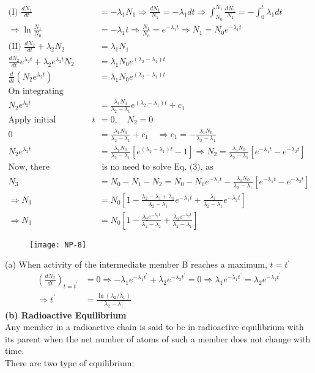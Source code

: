 \begin{align*}
\text{(I) }\frac{d N_1}{d t}&=-\lambda_1 N_1 \Rightarrow \frac{d N_1}{N_1}=-\lambda_1 d t \Rightarrow \int_{N_0}^{N_1} \frac{d N_1}{N_1}=-\int_0^t \lambda_1 d t\\
\Rightarrow \ln \frac{N_1}{N_0}&=-\lambda_1 t \Rightarrow \frac{N_1}{N_0}=e^{-\lambda_1 t} \Rightarrow N_1=N_0 e^{-\lambda_1 t}
\\
\text{(II) }\frac{d N_2}{d t}+\lambda_2 N_2&=\lambda_1 N_1\\
\frac{d N_2}{d t} e^{\lambda_2 t}+\lambda_2 e^{\lambda_2 t} N_2&=\lambda_1 N_0 e^{\left(\lambda_2-\lambda_1\right) t} \\
\frac{d}{d t}\left(N_2 e^{\lambda_2 t}\right)&=\lambda_1 N_0 e^{\left(\lambda_2-\lambda_1\right) t}\\
\text{On integrating}&\\
N_2 e^{\lambda_2 t}&=\frac{\lambda_1 N_0}{\lambda_2-\lambda_1} e^{\left(\lambda_2-\lambda_1\right) t}+c_1\\
\text{Apply initial condition }t&=0, \quad N_2=0\\
0&=\frac{\lambda_1 N_0}{\lambda_2-\lambda_1}+c_1 \quad \Rightarrow c_1=-\frac{\lambda_1 N_0}{\lambda_2-\lambda_1}\\
N_2 e^{\lambda_2 t}&=\frac{\lambda_1 N_0}{\lambda_2-\lambda_1}\left[e^{\left(\lambda_2-\lambda_1\right) t}-1\right] \Rightarrow N_2=\frac{\lambda_1 N_0}{\lambda_2-\lambda_1}\left[e^{-\lambda_1 t}-e^{-\lambda_2 t}\right]\\
\text{Now, there}&\text{ is no need to solve Eq. (3), as}\\
N_3&=N_0-N_1-N_2=N_0-N_0 e^{-\lambda_1 t}-\frac{\lambda_1 N_0}{\lambda_2-\lambda_1}\left[e^{-\lambda_1 t}-e^{-\lambda_2 t}\right] \\
\Rightarrow N_3&=N_0\left[1-\frac{\lambda_2-\lambda_1+\lambda_1}{\lambda_2-\lambda_1} e^{-\lambda_1 t}+\frac{\lambda_1}{\lambda_2-\lambda_1} e^{-\lambda_2 t}\right] \\
\Rightarrow N_3&=N_0\left[1-\frac{\lambda_2 e^{-\lambda_1 t}}{\lambda_2-\lambda_1}+\frac{\lambda_1 e^{-\lambda_2 t}}{\lambda_2-\lambda_1}\right]
\end{align*}
\begin{figure}[H]
	\centering
	\texttt{[image: NP-8]}
	\caption{}
	\label{}
\end{figure}
(a) When activity of the intermediate member B reaches a maximum, $t=t^{\prime}$
\begin{align*}
\left(\frac{d N_2}{d t}\right)_{t=t^{\prime}}&=0 \Rightarrow-\lambda_1 e^{-\lambda_1 t^{\prime}}+\lambda_2 e^{-\lambda_2 t^{\prime}}=0 \Rightarrow \lambda_1 e^{-\lambda_1 t^{\prime}}=\lambda_2 e^{-\lambda_2 t^{\prime}} \\
\Rightarrow t^{\prime}&=\frac{\ln \left(\lambda_2 / \lambda_1\right)}{\lambda_2-\lambda_1}
\end{align*}
\textbf{(b) Radioactive Equilibrium}\\
Any member in a radioactive chain is said to be in radioactive equilibrium with its parent when the net number of atoms of such a member does not change with time.\\
There are two type of equilibrium: